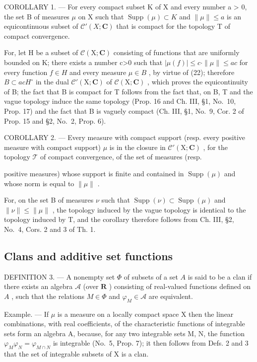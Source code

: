 COROLLARY 1. --- For every compact subset K of X and every number a \textgreater{} 0, the set B of measures \(\mu\) on X such that \(\operatorname{Supp}(\mu) \subset K\) and \(\|\mu\| \leqslant a\) is an equicontinuous subset of \(\mathcal{C}'(X; \mathbf{C})\) that is compact for the topology T of compact convergence.

For, let H be a subset of \(\mathcal{C}(\mathrm{X};\mathbf{C})\) consisting of functions that are uniformly bounded on K; there exists a number c\textgreater0 such that \(|\mu(f)|\leqslant c\cdot\|\mu\|\leqslant ac\) for every function \(f\in H\) and every measure \(\mu\in B\) , by virtue of (22); therefore \(B\subset acH^{\circ}\) in the dual \(\mathcal{C}'(\mathrm{X};\mathbf{C})\) of \(\mathcal{C}(\mathrm{X};\mathbf{C})\) , which proves the equicontinuity of B; the fact that B is compact for T follows from the fact that, on B, T and the vague topology induce the same topology (Prop. 16 and Ch. III, §1, No.~10, Prop. 17) and the fact that B is vaguely compact (Ch. III, §1, No.~9, Cor. 2 of Prop. 15 and §2, No.~2, Prop. 6).

COROLLARY 2. --- Every measure with compact support (resp. every positive measure with compact support) \(\mu\) is in the closure in \(\mathcal{C}'(\mathrm{X};\mathbf{C})\) , for the topology \(\mathcal{T}\) of compact convergence, of the set of measures (resp.

positive measures) whose support is finite and contained in \(\operatorname{Supp}(\mu)\) and whose norm is equal to \(\| \mu \|\) .

For, on the set B of measures \(\nu\) such that \(\operatorname{Supp}(\nu) \subset \operatorname{Supp}(\mu)\) and \(\|\nu\| \leqslant \|\mu\|\) , the topology induced by the vague topology is identical to the topology induced by T, and the corollary therefore follows from Ch. III, §2, No.~4, Cors. 2 and 3 of Th. 1.

\subsection{Clans and additive set functions}

DEFINITION 3. --- A nonempty set \(\Phi\) of subsets of a set \(A\) is said to be a clan if there exists an algebra \(\mathcal{A}\) (over \(\mathbf{R}\) ) consisting of real-valued functions defined on \(A\) , such that the relations \(M \in \Phi\) and \(\varphi_{M} \in \mathcal{A}\) are equivalent.

Example. --- If \(\mu\) is a measure on a locally compact space X then the linear combinations, with real coefficients, of the characteristic functions of integrable sets form an algebra A, because, for any two integrable sets M, N, the function \(\varphi_{M}\varphi_{N} = \varphi_{M\cap N}\) is integrable (No.~5, Prop. 7); it then follows from Defs. 2 and 3 that the set of integrable subsets of X is a clan.

